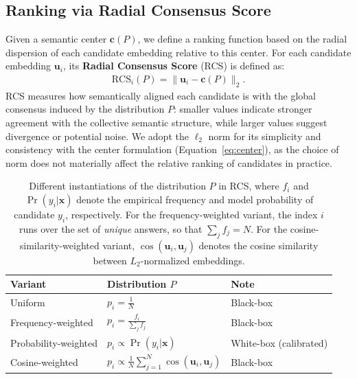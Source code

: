 \subsection{Ranking via Radial Consensus Score}\label{sec:main-rcs}

Given a semantic center $\mathbf{c}(P)$, we define a ranking function based on the radial dispersion of each candidate embedding relative to this center.
For each candidate embedding $\mathbf{u}_i$, its \textbf{Radial Consensus Score} (RCS) is defined as:
\begin{align}
    \mathrm{RCS}_i(P) = \|\mathbf{u}_i - \mathbf{c}(P)\|_2.
\end{align}
RCS measures how semantically aligned each candidate is with the global consensus induced by the distribution $P$: smaller values indicate stronger agreement with the collective semantic structure, while larger values suggest divergence or potential noise. 
We adopt the $\ell_2$ norm for its simplicity and consistency with the center formulation (Equation~\ref{eq:center}), as the choice of norm does not materially affect the relative ranking of candidates in practice.

\begin{table}[t]
\centering
\caption{Different instantiations of the distribution $P$ in RCS, where $f_i$ and $\Pr(y_i|\mathbf{x})$ denote the empirical frequency and model probability of candidate $y_i$, respectively. For the frequency-weighted variant, the index $i$ runs over the set of \emph{unique} answers, so that $\sum_j f_j = N$. For the cosine-similarity-weighted variant, $\cos(\mathbf{u}_i,\mathbf{u}_j)$ denotes the cosine similarity between $L_2$-normalized embeddings.}
\label{tab:rds_variants}
\begin{tabular}{l l l}
\toprule
\textbf{Variant} & \textbf{Distribution $P$} & \textbf{Note} \\
\midrule
Uniform & $p_i = \frac{1}{N}$ & Black-box\\
Frequency-weighted & $p_i = \frac{f_i}{\sum_j f_j}$ & Black-box\\
Probability-weighted & $p_i \propto \Pr(y_i|\mathbf{x})$ & White-box (calibrated)\\
Cosine-weighted & $p_i \propto \frac{1}{N}\sum_{j=1}^N \cos(\mathbf{u}_i,\mathbf{u}_j)$ & Black-box\\
\bottomrule
\end{tabular}
\end{table}


